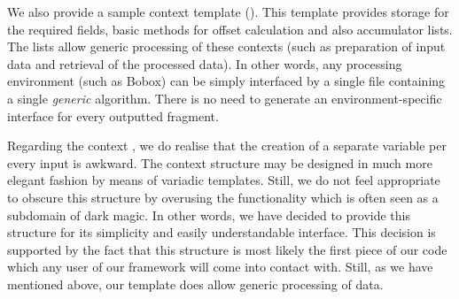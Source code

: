 We also provide a sample context template (). This template provides storage for the required fields, basic methods for offset calculation and also accumulator lists. The lists allow generic processing of these contexts (such as preparation of input data and retrieval of the processed data). In other words, any processing environment (such as Bobox) can be simply interfaced by a single file containing a single \emph{generic} algorithm. There is no need to generate an environment-specific interface for every outputted fragment.

Regarding the context , we do realise that the creation of a separate variable per every input is awkward. The context structure may be designed in much more elegant fashion by means of variadic templates. Still, we do not feel appropriate to obscure this structure by overusing the functionality which is often seen as a subdomain of dark magic. In other words, we have decided to provide this structure for its simplicity and easily understandable interface. This decision is supported by the fact that this structure is most likely the first piece of our code which any user of our framework will come into contact with. Still, as we have mentioned above, our template does allow generic processing of data.

